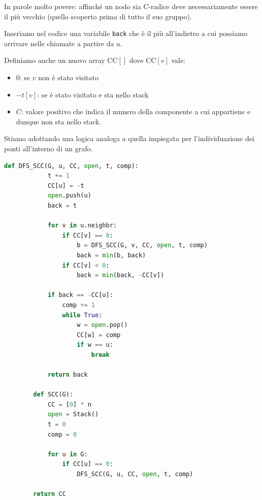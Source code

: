 \documentclass[12pt]{report}
\begin{document}
	In parole molto povere: affinché un nodo sia C-radice deve necessariamente essere il più vecchio (quello scoperto prima di tutto il suo gruppo).
	
	Inseriamo nel codice una variabile \texttt{back} che è il più all'indietro a cui possiamo arrivare nelle chiamate a partire da $u$.
	
	Definiamo anche un nuovo array $\text{CC}[]$ dove $\text{CC}[v]$ vale:
	\begin{itemize}
		\item $0$: se $v$ non è stato visitato
		\item $-t[v]$: se è stato visitato e sta nello stack
		\item $C$: valore positivo che indica il numero della componente a cui appartiene e dunque non sta nello stack.
	\end{itemize}
	
	Stiamo adottando una logica analoga a quella impiegata per l'individuazione dei ponti all'interno di un grafo.
	
	\begin{lstlisting}[style=stile-listings, language=Python, caption={Algoritmo di Tarjan per la ricerca delle componenti fortemente connesse}]
		def DFS_SCC(G, u, CC, open, t, comp):
			t += 1
			CC[u] = -t
			open.push(u)
			back = t
			
			for v in u.neighbr:
				if CC[v] == 0:
					b = DFS_SCC(G, v, CC, open, t, comp)
					back = min(b, back)
				if CC[v] < 0:
					back = min(back, -CC[v])
			
			if back == -CC[u]:
				comp += 1
				while True:
					w = open.pop()
					CC[w] = comp
					if w == u:
						break
			
			return back
			
		def SCC(G):
			CC = [0] * n
			open = Stack()
			t = 0
			comp = 0
			
			for u in G:
				if CC[u] == 0:
					DFS_SCC(G, u, CC, open, t, comp)
			
		return CC
	\end{lstlisting}
	
\end{document}
